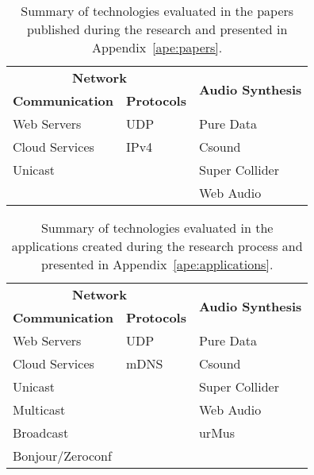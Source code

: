 \begin{table}[!ht]
	\centering
	\begin{tabular}{l|l|l}
		\multicolumn{2}{c|}{\textbf{Network}} & \multirow{2}{*}{\textbf{Audio Synthesis}} \\ \cline{1-2}
		\textbf{Communication}   & \textbf{Protocols}  &                                  \\ \hline
		Web Servers     & UDP        & Pure Data                        \\ \hline
		Cloud Services  & IPv4       & Csound                           \\ \cline{1-1} \cline{3-3} 
		Unicast         &            & Super Collider                   \\ \cline{1-1} \cline{3-3} 
		&            & Web Audio                        \\ \hline
	\end{tabular}
	\caption{Summary of technologies evaluated in the papers published during the research and presented in Appendix~\ref{ape:papers}.}
	\label{tab:summarytechpapers}
\end{table}



\begin{table}[!ht]
	\centering
	\begin{tabular}{l|l|l}
		\multicolumn{2}{c|}{\textbf{Network}} & \multirow{2}{*}{\textbf{Audio Synthesis}} \\ \cline{1-2}
		\textbf{Communication}    & \textbf{Protocols} &                                  \\ \hline
		Web Servers      & UDP       & Pure Data                        \\ \hline
		Cloud Services   & mDNS      & Csound                           \\ \cline{1-1} \cline{3-3} 
		Unicast          &           & Super Collider                   \\ \cline{1-1} \cline{3-3} 
		Multicast        &           & Web Audio                        \\ \cline{1-1} \cline{3-3} 
		Broadcast        &           & urMus                            \\ \cline{1-1}
		Bonjour/Zeroconf &           &                                  \\ \hline
	\end{tabular}
	\caption{Summary of technologies evaluated in the applications created during the research process and presented in Appendix~\ref{ape:applications}.}
	\label{tab:summarytechapps}
\end{table}
